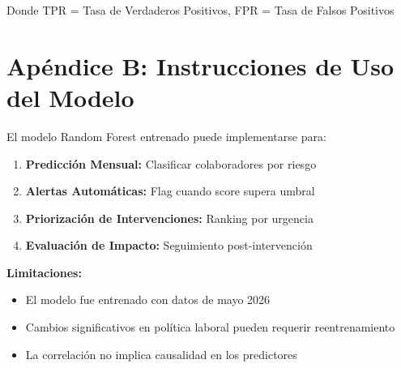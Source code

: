 \documentclass[11pt,a4paper,twoside]{article}
\begin{document}
Donde TPR = Tasa de Verdaderos Positivos, FPR = Tasa de Falsos Positivos

\newpage
\section*{Apéndice B: Instrucciones de Uso del Modelo}

El modelo Random Forest entrenado puede implementarse para:

\begin{enumerate}
    \item \textbf{Predicción Mensual:} Clasificar colaboradores por riesgo
    \item \textbf{Alertas Automáticas:} Flag cuando score supera umbral
    \item \textbf{Priorización de Intervenciones:} Ranking por urgencia
    \item \textbf{Evaluación de Impacto:} Seguimiento post-intervención
\end{enumerate}

\textbf{Limitaciones:}
\begin{itemize}
    \item El modelo fue entrenado con datos de mayo 2026
    \item Cambios significativos en política laboral pueden requerir reentrenamiento
    \item La correlación no implica causalidad en los predictores
\end{itemize}
\end{document}
